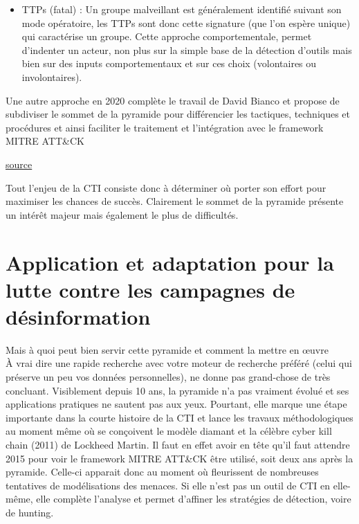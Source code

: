 \documentclass[a4paper]{article}
\begin{document}
\begin{itemize}
\item TTPs (fatal) : Un groupe malveillant est généralement identifié suivant son mode opératoire, les TTPs sont donc cette signature (que l’on espère unique) qui caractérise un groupe. Cette approche comportementale, permet d’indenter un acteur, non plus sur la simple base de la détection d’outils mais bien sur des inputs comportementaux et sur ces choix (volontaires ou involontaires). 
\end{itemize}

Une autre approche en 2020 complète le travail de David Bianco et propose de subdiviser le sommet de la pyramide pour différencier les tactiques, techniques et procédures et ainsi faciliter le traitement et l’intégration avec le framework MITRE ATT\&CK

\href{https://scythe.io/library/summiting-the-pyramid-of-pain-the-ttp-pyramid}{source}

Tout l’enjeu de la CTI consiste donc à déterminer où porter son effort pour maximiser les chances de succès. Clairement le sommet de la pyramide présente un intérêt majeur mais également le plus de difficultés.

\section{Application et adaptation pour la lutte contre les campagnes de désinformation }

Mais à quoi peut bien servir cette pyramide et comment la mettre en œuvre
\\
À vrai dire une rapide recherche avec votre moteur de recherche préféré (celui qui préserve un peu vos données personnelles), ne donne pas grand-chose de très concluant. Visiblement depuis 10 ans, la pyramide n’a pas vraiment évolué et ses applications pratiques ne sautent pas aux yeux. Pourtant, elle marque une étape importante dans la courte histoire de la CTI et lance les travaux méthodologiques au moment même où se conçoivent le modèle diamant et la célèbre cyber kill chain (2011) de Lockheed Martin. Il faut en effet avoir en tête qu’il faut attendre 2015 pour voir le framework MITRE ATT&CK être utilisé, soit deux ans après la pyramide. Celle-ci apparait donc au moment où fleurissent de nombreuses tentatives de modélisations des menaces. Si elle n’est pas un outil de CTI en elle-même, elle complète l’analyse et permet d’affiner les stratégies de détection, voire de hunting. 
\end{document}
